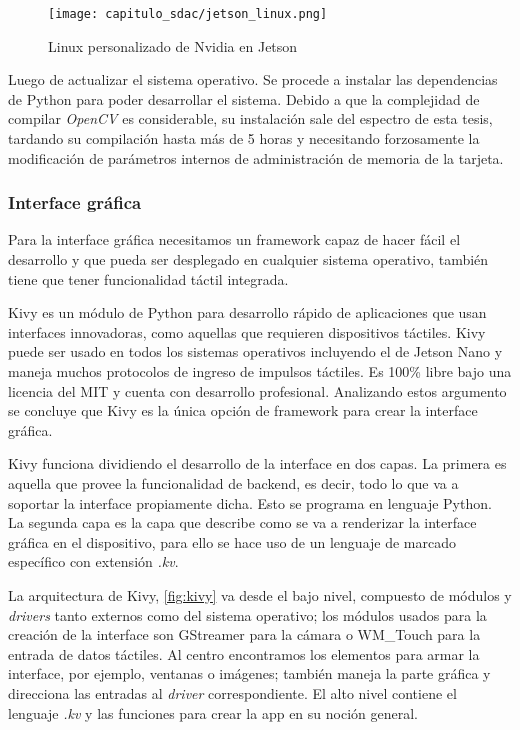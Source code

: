 \begin{figure}[H]
    \centering
    \texttt{[image: capitulo\_sdac/jetson\_linux.png]}
    \caption{Linux personalizado de Nvidia en Jetson}\label{fig:jetson_linux}
\end{figure}

Luego de actualizar el sistema operativo. Se procede a instalar las dependencias
de Python para poder desarrollar el sistema. Debido a que la complejidad de
compilar \emph{OpenCV} es considerable, su instalación sale del espectro de esta
tesis, tardando su compilación hasta más de 5 horas y necesitando forzosamente
la modificación de parámetros internos de administración de memoria de la
tarjeta.

\subsubsection{Interface gráfica}

Para la interface gráfica necesitamos un framework capaz de hacer fácil el
desarrollo y que pueda ser desplegado en cualquier sistema operativo, también
tiene que tener funcionalidad táctil integrada.

Kivy es un módulo de Python para desarrollo rápido de aplicaciones que usan
interfaces innovadoras, como aquellas que requieren dispositivos táctiles. Kivy
puede ser usado en todos los sistemas operativos incluyendo el de Jetson Nano y
maneja muchos protocolos de ingreso de impulsos táctiles. Es 100\% libre bajo
una licencia del MIT y cuenta con desarrollo profesional. Analizando estos
argumento se concluye que Kivy es la única opción de framework para crear la
interface gráfica.

Kivy funciona dividiendo el desarrollo de la interface en dos capas. La primera
es aquella que provee la funcionalidad de backend, es decir, todo lo que va a
soportar la interface propiamente dicha. Esto se programa en lenguaje Python. La
segunda capa es la capa que describe como se va a renderizar la interface
gráfica en el dispositivo, para ello se hace uso de un lenguaje de marcado
específico con extensión \emph{.kv}.

La arquitectura de Kivy, \autoref{fig:kivy} va desde el bajo nivel, compuesto de
módulos y \emph{drivers} tanto externos como del sistema operativo; los módulos
usados para la creación de la interface son GStreamer para la cámara o WM\_Touch
para la entrada de datos táctiles. Al centro encontramos los elementos para
armar la interface, por ejemplo, ventanas o imágenes; también maneja la parte
gráfica y direcciona las entradas al \emph{driver} correspondiente. El alto
nivel contiene el lenguaje \emph{.kv} y las funciones para crear la app en su noción
general.

